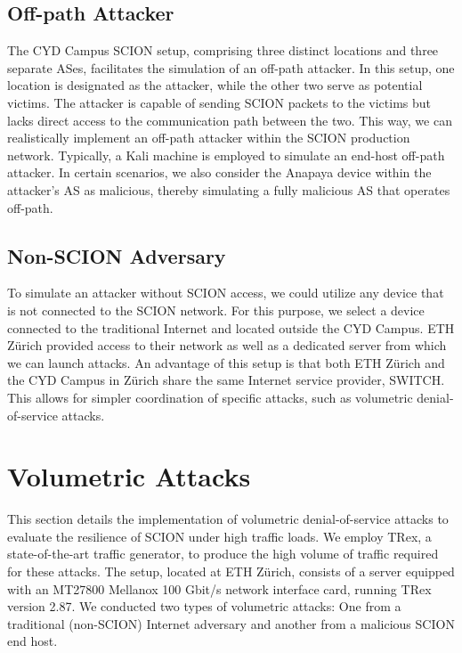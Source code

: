 \subsection{Off-path Attacker}

The CYD Campus SCION setup, comprising three distinct locations and three separate ASes, facilitates the simulation of an off-path attacker.
In this setup, one location is designated as the attacker, while the other two serve as potential victims.
The attacker is capable of sending SCION packets to the victims but lacks direct access to the communication path between the two.
This way, we can realistically implement an off-path attacker within the SCION production network.
Typically, a Kali machine is employed to simulate an end-host off-path attacker.
In certain scenarios, we also consider the Anapaya device within the attacker's AS as malicious, thereby simulating a fully malicious AS that operates off-path.

\subsection{Non-SCION Adversary}
To simulate an attacker without SCION access, we could utilize any device that is not connected to the SCION network.
For this purpose, we select a device connected to the traditional Internet and located outside the CYD Campus.
ETH Zürich provided access to their network as well as a dedicated server from which we can launch attacks.
An advantage of this setup is that both ETH Zürich and the CYD Campus in Zürich share the same Internet service provider, SWITCH.
This allows for simpler coordination of specific attacks, such as volumetric denial-of-service attacks.

\newpage
\section{Volumetric Attacks}
\label{sec:impl:VolumetricDoS}
This section details the implementation of volumetric denial-of-service attacks to evaluate the resilience of SCION under high traffic loads.
We employ TRex, a state-of-the-art traffic generator, to produce the high volume of traffic required for these attacks.
The setup, located at ETH Zürich, consists of a server equipped with an MT27800 Mellanox 100 Gbit/s network interface card, running TRex version 2.87.
We conducted two types of volumetric attacks:
One from a traditional (non-SCION) Internet adversary and another from a malicious SCION end host.

